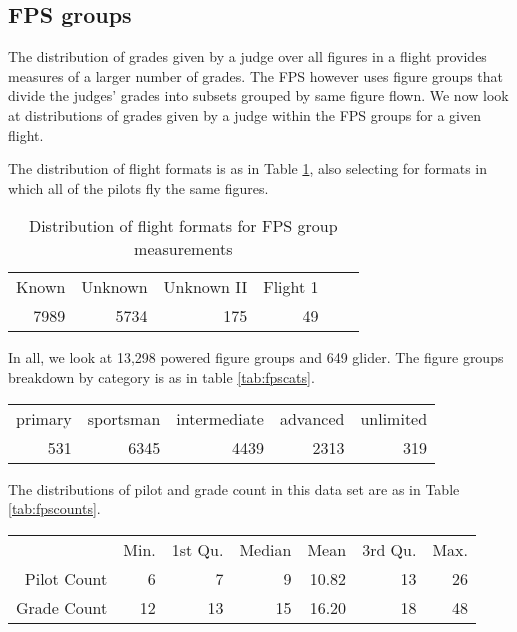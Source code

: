\subsection{FPS groups}

The distribution of grades given by a judge over all figures in a flight
provides measures of a larger number of grades. The FPS however uses figure
groups that divide the judges' grades into subsets grouped by same figure
flown.  We now look at distributions of grades given by a judge within the FPS
groups for a given flight.

The distribution of flight formats is as in Table
\ref{tab:fpsformat}, also selecting for formats in which all of the pilots
fly the same figures.

\begin{table}[htbp]
  \centering
  \begin{tabular}{r r r r r r}
  Known & Unknown & Unknown II & Flight 1 \\
  7989 & 5734 & 175 & 49 \\
  \end{tabular}
  \caption{Distribution of flight formats for FPS group measurements}
  \label{tab:fpsformat}
\end{table}

In all, we look at 13,298 powered figure groups and 649 glider. The figure
groups breakdown by category is as in table \ref{tab:fpscats}.

\begin{table*}[tbp]
  \begin{tabular}{r r r r r}
  primary  & sportsman & intermediate  &  advanced  & unlimited  \\
      531  &      6345 &         4439  &      2313  &       319  \\
  \end{tabular}
  \caption{Distribution of categories for FPS group measurements}
  \label{tab:fpscats}
\end{table*}

The distributions of pilot and grade count in this data set are as in
Table \ref{tab:fpscounts}.

\begin{table*}[tbp]
  \begin{tabular}{r | r r r r r r}
  & Min. & 1st Qu. & Median & Mean & 3rd Qu. & Max. \\
  Pilot Count &  6 &  7 &  9 & 10.82 &  13 &  26 \\
  Grade Count & 12 & 13 & 15 & 16.20 & 18 & 48 \\
  \end{tabular}
  \caption{Distribution of pilot and grade counts for FPS group measurements}
  \label{tab:fpscounts}
\end{table*}

